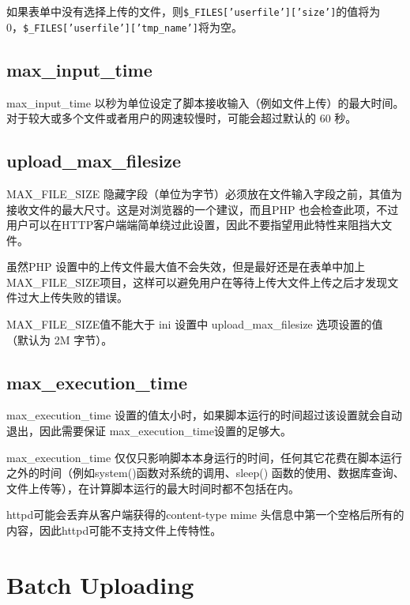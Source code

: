 如果表单中没有选择上传的文件，则\texttt{\$\_FILES['userfile']['size']}的值将为 0，\texttt{\$\_FILES['userfile']['tmp\_name']}将为空。

\subsection{max\_input\_time}



max\_input\_time 以秒为单位设定了脚本接收输入（例如文件上传）的最大时间。对于较大或多个文件或者用户的网速较慢时，可能会超过默认的 60 秒。


\subsection{upload\_max\_filesize}


MAX\_FILE\_SIZE 隐藏字段（单位为字节）必须放在文件输入字段之前，其值为接收文件的最大尺寸。这是对浏览器的一个建议，而且PHP 也会检查此项，不过用户可以在HTTP客户端端简单绕过此设置，因此不要指望用此特性来阻挡大文件。


虽然PHP 设置中的上传文件最大值不会失效，但是最好还是在表单中加上MAX\_FILE\_SIZE项目，这样可以避免用户在等待上传大文件上传之后才发现文件过大上传失败的错误。

MAX\_FILE\_SIZE值不能大于 ini 设置中 upload\_max\_filesize 选项设置的值（默认为 2M 字节）。

\subsection{max\_execution\_time}


max\_execution\_time 设置的值太小时，如果脚本运行的时间超过该设置就会自动退出，因此需要保证 max\_execution\_time设置的足够大。



max\_execution\_time 仅仅只影响脚本本身运行的时间，任何其它花费在脚本运行之外的时间（例如system()函数对系统的调用、sleep() 函数的使用、数据库查询、文件上传等），在计算脚本运行的最大时间时都不包括在内。




httpd可能会丢弃从客户端获得的content-type mime 头信息中第一个空格后所有的内容，因此httpd可能不支持文件上传特性。



\section{Batch Uploading}

